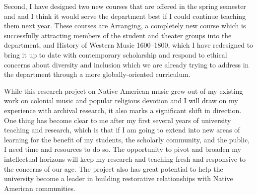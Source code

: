 \documentclass[12pt]{article}
\begin{document}
Second, I have designed two new courses that are offered in the spring
semester and and I think it would serve the department best if I could
continue teaching them next year.
These courses are Arranging, a completely new course which is successfully
attracting members of the student  and theater groups into the
department, and History of Western Music 1600--1800, which I have redesigned
to bring it up to date with contemporary scholarship and respond to ethical
concerns about diversity and inclusion which we are already trying to address
in the department through a more globally-oriented curriculum.

While this research project on Native American music grew out of my existing
work on colonial music and popular religious devotion and I will draw on my
experience with archival research, it also marks a significant shift in
direction.
One thing has become clear to me after my first several years of university
teaching and research, which is that if I am going to extend into new areas of
learning for the benefit of my students, the scholarly community, and the
public, I need time and resources to do so. 
The opportunity to pivot and broaden my intellectual horizons will keep my
research and teaching fresh and responsive to the concerns of our age. 
The project also has great potential to help the university become a leader in
building restorative relationships with Native American communities.
\end{document}
